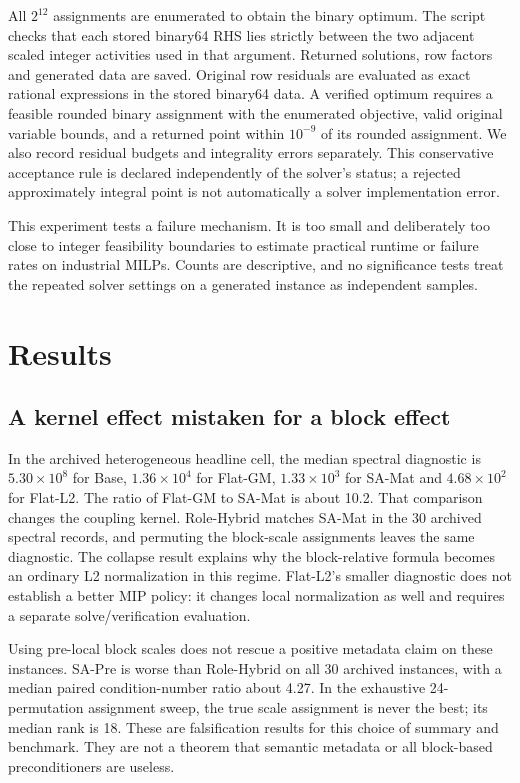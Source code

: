 \documentclass[11pt]{article}
\theoremstyle{definition}
\theoremstyle{remark}
\begin{document}
All $2^{12}$ assignments are enumerated to obtain the binary optimum. The script checks
that each stored binary64 RHS lies strictly between the two adjacent scaled integer
activities used in that argument. Returned solutions, row factors and generated data
are saved. Original row residuals are evaluated as exact rational expressions in the
stored binary64 data. A verified optimum requires a feasible rounded binary assignment
with the enumerated objective, valid original variable bounds, and a returned point
within $10^{-9}$ of its rounded assignment. We also record residual budgets and
integrality errors separately. This conservative acceptance rule is declared independently
of the solver's status; a rejected approximately integral point is not automatically a
solver implementation error.

This experiment tests a failure mechanism. It is too small and deliberately too close
to integer feasibility boundaries to estimate practical runtime or failure rates on
industrial MILPs. Counts are descriptive, and no significance tests treat the repeated
solver settings on a generated instance as independent samples.

\section{Results}
\label{sec:results}
\subsection{A kernel effect mistaken for a block effect}
In the archived heterogeneous headline cell, the median spectral diagnostic is
$5.30\times10^8$ for Base, $1.36\times10^4$ for Flat-GM,
$1.33\times10^3$ for SA-Mat and $4.68\times10^2$ for Flat-L2.
The ratio of Flat-GM to SA-Mat is about 10.2. That comparison changes the coupling
kernel. Role-Hybrid matches SA-Mat in the 30 archived spectral records, and permuting
the block-scale assignments leaves the same diagnostic. The collapse result explains
why the block-relative formula becomes an ordinary L2 normalization in this regime.
Flat-L2's smaller diagnostic does not establish a better MIP policy: it changes local
normalization as well and requires a separate solve/verification evaluation.

Using pre-local block scales does not rescue a positive metadata claim on these
instances. SA-Pre is worse than Role-Hybrid on all 30 archived instances, with a median
paired condition-number ratio about 4.27. In the exhaustive 24-permutation assignment
sweep, the true scale assignment is never the best; its median rank is 18. These are
falsification results for this choice of summary and benchmark. They are not a theorem
that semantic metadata or all block-based preconditioners are useless.
\end{document}
